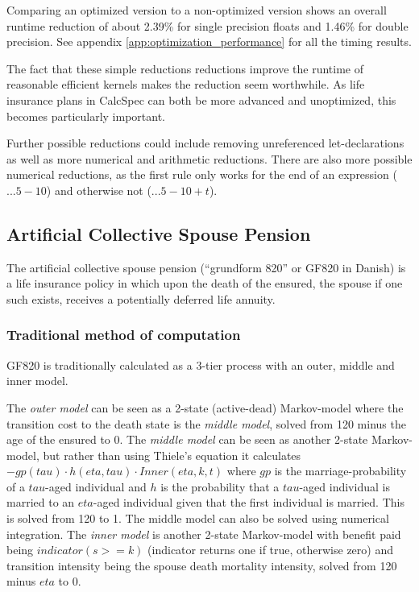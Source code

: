 Comparing an optimized version to a non-optimized version shows an overall runtime reduction of about 2.39\% for single precision floats and 1.46\% for double precision.
See appendix \ref{app:optimization_performance} for all the timing results.

The fact that these simple reductions reductions improve the runtime of reasonable efficient kernels makes the reduction seem worthwhile.
As life insurance plans in CalcSpec can both be more advanced and unoptimized, this becomes particularly important.

Further possible reductions could include removing unreferenced let-declarations as well as more numerical and arithmetic reductions.
There are also more possible numerical reductions, as the first rule only works for the end of an expression ($... 5 - 10$) and otherwise not ($... 5 - 10 + t$).

\subsection{Artificial Collective Spouse Pension}
The artificial collective spouse pension (``grundform 820'' or GF820 in Danish) is a life insurance policy in which upon the death of the ensured, the spouse if one such exists, receives a potentially deferred life annuity.

\subsubsection{Traditional method of computation}
GF820 is traditionally calculated as a 3-tier process with an outer, middle and inner model.

The \emph{outer model} can be seen as a 2-state (active-dead) Markov-model where the transition cost to the death state is the \emph{middle model}, solved from 120 minus the age of the ensured to 0.
The \emph{middle model} can be seen as another 2-state Markov-model, but rather than using Thiele's equation it calculates $-gp(tau) \cdot h(eta, tau) \cdot Inner(eta, k, t)$ where $gp$ is the marriage-probability of a $tau$-aged individual and $h$ is the probability that a $tau$-aged individual is married to an $eta$-aged individual given that the first individual is married.
This is solved from 120 to 1. The middle model can also be solved using numerical integration.
The \emph{inner model} is another 2-state Markov-model with benefit paid being $indicator(s >= k)$ (indicator returns one if true, otherwise zero) and transition intensity being the spouse death mortality intensity, solved from 120 minus $eta$ to 0.

